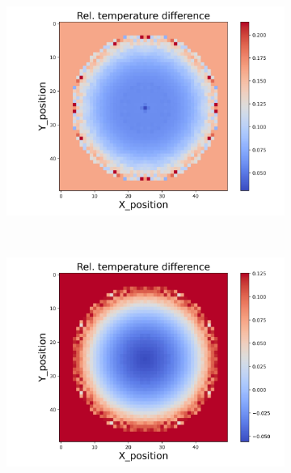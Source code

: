 \begin{figure}[h]
\begin{minipage}{\textwidth}
\begin{subfigure}{0.325\textwidth}
        \end{subfigure}
        \begin{subfigure}{0.325\textwidth}
            \centering
            \includegraphics[width=\textwidth]{figures/raw_data/21/mix/T_bias.jpg}
        \end{subfigure}
    \end{minipage}\\
    \begin{minipage}{\textwidth}
        \centering
        \begin{subfigure}{0.325\textwidth}
            \centering
            \includegraphics[width=\textwidth]{figures/raw_data/22/mix/T_bias.jpg}

\end{subfigure}
\end{minipage}
\end{figure}

